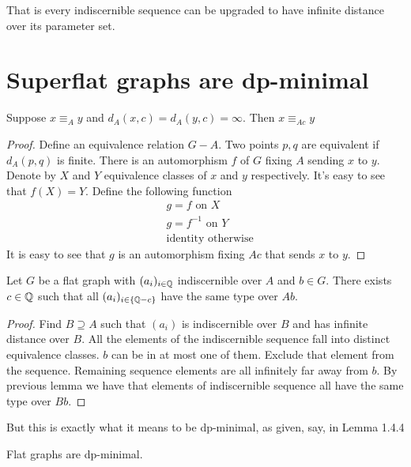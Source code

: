 \documentclass{amsart}
\begin{document}
That is every indiscernible sequence can be upgraded to have infinite distance over its parameter set.

\section{Superflat graphs are dp-minimal}

\begin{Lemma}
	Suppose $x \equiv_A y$ and $d_A(x, c) = d_A(y, c) = \infty$. Then $x \equiv_{Ac} y$
\end{Lemma}

\begin{proof}
	Define an equivalence relation $G - A$. Two points $p, q$ are equivalent if $d_A(p,q)$ is finite. There is an automorphism $f$ of $G$ fixing $A$ sending $x$ to $y$. Denote by $X$ and $Y$ equivalence classes of $x$ and $y$ respectively. It's easy to see that $f(X) = Y$. Define the following function
	\begin{align*}
		&g = f \text { on } X \\
		&g = f^{-1} \text { on } Y \\
		&\text{identity otherwise}
	\end{align*}
	It is easy to see that $g$ is an automorphism fixing $Ac$ that sends $x$ to $y$.
\end{proof}

\begin{Theorem}
	Let $G$ be a flat graph with $(a_i)_{i\in\mathbb{Q}}$ indiscernible over $A$ and $b \in G$. There exists $c \in \mathbb{Q}$ such that all $(a_i)_{i\in\{\mathbb{Q} - c\}}$ have the same type over $Ab$.
\end{Theorem}

\begin{proof}
	Find $B \supseteq A$ such that $(a_i)$ is indiscernible over $B$ and has infinite distance over $B$. All the elements of the indiscernible sequence fall into distinct equivalence classes. $b$ can be in at most one of them. Exclude that element from the sequence. Remaining sequence elements are all infinitely far away from $b$. By previous lemma we have that elements of indiscernible sequence all have the same type over $Bb$.
\end{proof}

But this is exactly what it means to be dp-minimal, as given, say, in \cite{simon_dp_minimal} Lemma 1.4.4

\begin{Corollary}
	Flat graphs are dp-minimal.
\end{Corollary}
\end{document}
